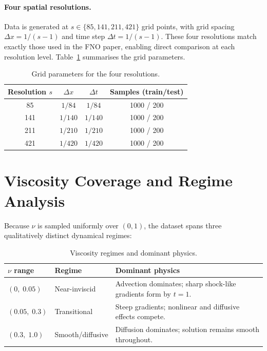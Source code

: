 \paragraph{Four spatial resolutions.}
Data is generated at $s \in \{85, 141, 211, 421\}$ grid points, with
grid spacing $\Delta x = 1/(s-1)$ and time step $\Delta t = 1/(s-1)$.
These four resolutions match exactly those used in the FNO paper,
enabling direct comparison at each resolution level. Table~\ref{tab:grid}
summarises the grid parameters.

\begin{table}[h]
  \centering
  \caption{Grid parameters for the four resolutions.}
  \label{tab:grid}
  \begin{tabular}{@{}cccc@{}}
    \toprule
    Resolution $s$ & $\Delta x$ & $\Delta t$ & Samples (train/test) \\
    \midrule
    85  & $1/84$  & $1/84$  & 1000 / 200 \\
    141 & $1/140$ & $1/140$ & 1000 / 200 \\
    211 & $1/210$ & $1/210$ & 1000 / 200 \\
    421 & $1/420$ & $1/420$ & 1000 / 200 \\
    \bottomrule
  \end{tabular}
\end{table}

\section{Viscosity Coverage and Regime Analysis}
\label{sec:viscosity-coverage}

Because $\nu$ is sampled uniformly over $(0,1)$, the dataset spans three
qualitatively distinct dynamical regimes:

\begin{table}[h]
  \centering
  \caption{Viscosity regimes and dominant physics.}
  \label{tab:nu-regimes}
  \begin{tabular}{@{}lll@{}}
    \toprule
    $\nu$ range & Regime & Dominant physics \\
    \midrule
    $(0,\;0.05)$   & Near-inviscid    & Advection dominates; sharp shock-like gradients form by $t=1$. \\
    \addlinespace
    $(0.05,\;0.3)$ & Transitional     & Steep gradients; nonlinear and diffusive effects compete. \\
    \addlinespace
    $(0.3,\;1.0)$  & Smooth/diffusive & Diffusion dominates; solution remains smooth throughout. \\
    \bottomrule
  \end{tabular}
\end{table}

